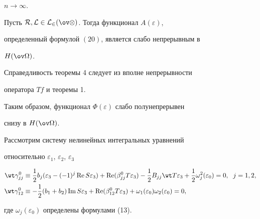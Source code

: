 $n\to\infty$. 


 


\begin{thm} 


Пусть $\cal R,\cal L\in L_2(\ov\Omega)$. Тогда функционал $A(\varepsilon)$, 


определенный формулой $(20)$, является слабо непрерывным в 


$H(\ov\Omega)$. 


\end{thm} 


 


Справедливость теоремы 4 следует из вполне непрерывности 


оператора $T f$ и теоремы 1. 


 


Таким образом, функционал $\Phi(\varepsilon)$ слабо полунепрерывен 


снизу в $H(\ov\Omega)$. 


 


Рассмотрим систему нелинейных интегральных уравнений 


относительно $\varepsilon_1$, $\varepsilon_2$, $\varepsilon_3$


\begin{equation} 


\begin{split} 


\wt \gamma^0_{jj}&\equiv \frac{1}{2}b_j(\varepsilon_3- (-1)^j\re 


S\varepsilon_3)+\re(\beta^0_{jj}T \varepsilon_3)- \frac{1}{2}B_{jj}\wt 


T \varepsilon_3+\frac{1}{2}\omega^2_j(\varepsilon_0)=0,\ \; 


j=1,2,\\ 


% 


\wt \gamma^0_{12}&\equiv -\frac{1}{2}(b_1+b_2)\im S \varepsilon_3 


+\re(\beta^0_{12}T \varepsilon_3)+\omega_1(\varepsilon_0) 


\omega_2(\varepsilon_0)=0, 


\end{split} 


\end{equation} 


где $\omega_j(\varepsilon_0)$ определены формулами (13). 


